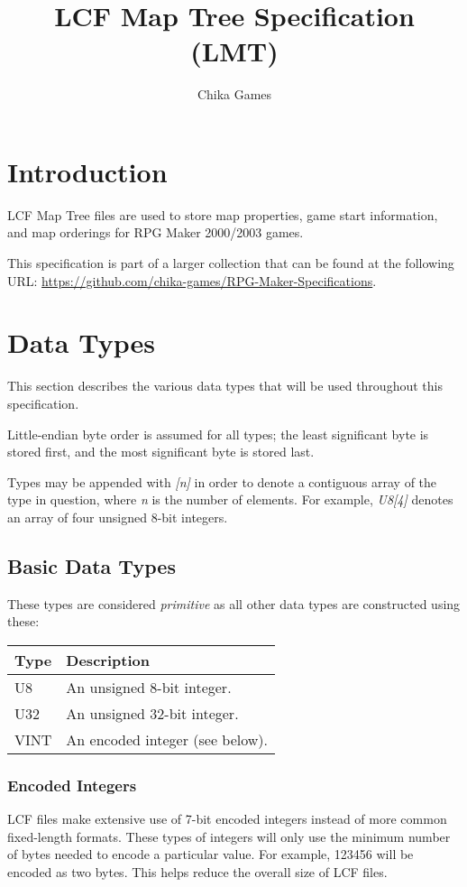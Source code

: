 

\title{LCF Map Tree Specification (LMT)}
\author{Chika Games}


\specpreamble

\section{Introduction}
LCF Map Tree files are used to store map properties, game start information, and map orderings for RPG Maker 2000/2003 games.

This specification is part of a larger collection that can be found at the following URL: \url{https://github.com/chika-games/RPG-Maker-Specifications}.

\section{Data Types}
This section describes the various data types that will be used throughout this specification.

Little-endian byte order is assumed for all types; the least significant byte is stored first, and the most significant byte is stored last.

Types may be appended with \textit{[n]} in order to denote a contiguous array of the type in question, where \textit{n} is the number of elements. For example, \textit{U8[4]} denotes an array of four unsigned 8-bit integers.

\subsection{Basic Data Types}
These types are considered \textit{primitive} as all other data types are constructed using these:

\begin{table}[h!]
\centering
\begin{tabular}{|l|l|}
\hline
\textbf{Type} & \textbf{Description}            \\ \hline
U8            & An unsigned 8-bit integer.      \\ \hline
U32           & An unsigned 32-bit integer.     \\ \hline
VINT          & An encoded integer (see below). \\ \hline
\end{tabular}
\end{table}

\subsubsection{Encoded Integers}
LCF files make extensive use of 7-bit encoded integers instead of more common fixed-length formats. These types of integers will only use the minimum number of bytes needed to encode a particular value. For example, 123456 will be encoded as two bytes. This helps reduce the overall size of LCF files.

